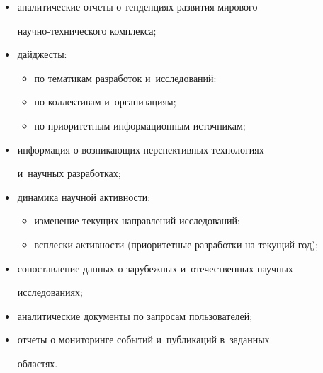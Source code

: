      \begin{itemize}


\item  аналитические отчеты о тенденциях развития мирового  


на\-уч\-но-тех\-ни\-че\-ско\-го комплекса;


\item дайджесты:


\begin{itemize}


\item


 по тематикам разработок и~исследований:


\item


 по коллективам и~организациям;


\item


 по приоритетным информационным источникам;


\end{itemize}


\item информация о возникающих перспективных технологиях 


и~научных разработках;


\item динамика научной активности:


\begin{itemize}


\item


 изменение текущих направлений исследований;


\item


 всплески активности (приоритетные разработки на текущий год);


\end{itemize}


\item сопоставление данных о зарубежных и~отечественных научных 


исследованиях;


\item аналитические документы по запросам пользователей;


\item отчеты о мониторинге событий и~публикаций в~заданных 


областях.


\end{itemize}





